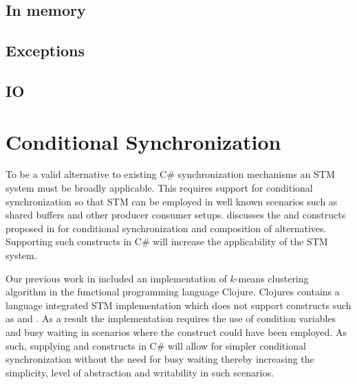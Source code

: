 
\cite[p. 50-52]{dpt907e14trending}


\subsection{In memory}
\subsection{Exceptions}

\subsection{IO}


\section{Conditional Synchronization}
\label{sec:req_conditional}
To be a valid alternative to existing C\# synchronization mechanisms an \ac{STM} system must be broadly applicable. This requires support for conditional synchronization so that \ac{STM} can be employed in well known scenarios such as shared buffers and other producer consumer setups\cite[p. 128]{tanenbaum2008modern}.  discusses the  and  constructs proposed in \cite{harris2005composable} for conditional synchronization and composition of alternatives. Supporting such constructs in C\# will increase the applicability of the \ac{STM} system.

Our previous work in \cite{dpt907e14trending} included an implementation of $k$-means clustering algorithm\cite[p. 451]{dataminingconceptsandtechniques} in the functional programming language Clojure. Clojures contains a language integrated \ac{STM} implementation which does not support constructs such as  and . As a result the implementation requires the use of condition variables and busy waiting in scenarios where the  construct could have been employed\cite{duffy2010stmnet}.  As such, supplying  and  constructs in C\# will allow for simpler conditional synchronization without the need for busy waiting thereby increasing the simplicity, level of abstraction and writability in such scenarios.

